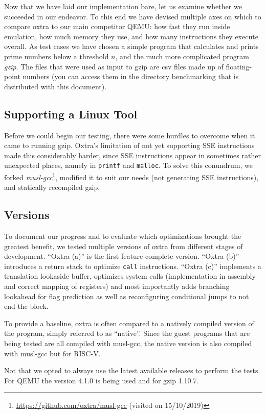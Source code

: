 Now that we have laid our implementation bare, let us examine whether we succeeded in our endeavor. To this end we have devised multiple axes on which to compare oxtra to our main competitor QEMU: how fast they run inside emulation, how much memory they use, and how many instructions they execute overall. As test cases we have chosen a simple program that calculates and prints prime numbers below a threshold \(n\), and the much more complicated program \emph{gzip}. The files that were used as input to gzip are csv files made up of floating-point numbers (you can access them in the directory benchmarking that is distributed with this document).

\subsection{Supporting a Linux Tool}
Before we could begin our testing, there were some hurdles to overcome when it came to running gzip. Oxtra's limitation of not yet supporting SSE instructions made this considerably harder, since SSE instructions appear in sometimes rather unexpected places, namely in \texttt{printf} and \texttt{malloc}. To solve this conundrum, we forked \emph{musl-gcc}\footnote{\url{https://github.com/oxtra/musl-gcc} (visited on 15/10/2019)}, modified it to suit our needs (not generating SSE instructions), and statically recompiled gzip.

\subsection{Versions}
To document our progress and to evaluate which optimizations brought the greatest benefit, we tested multiple versions of oxtra from different stages of development. \enquote{Oxtra (a)} is the first feature-complete version. \enquote{Oxtra (b)} introduces a return stack to optimize \texttt{call} instructions. \enquote{Oxtra (c)} implements a translation lookaside buffer, optimizes system calls (implementation in assembly and correct mapping of registers) and most importantly adds branching lookahead for flag prediction as well as reconfiguring conditional jumps to not end the block.

To provide a baseline, oxtra is often compared to a natively compiled version of the program, simply referred to as \enquote{native}. Since the guest programs that are being tested are all compiled with musl-gcc, the native version is also compiled with musl-gcc but for RISC-V.

Not that we opted to always use the latest available releases to perform the tests. For QEMU the version 4.1.0 is being used and for gzip 1.10.7.

